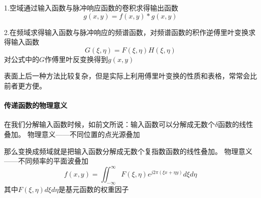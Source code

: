 \documentclass[UTF8]{ctexart}
\newcommand{\dbinf}{\iint_{-\infty}^{\infty}}
\begin{document}
1.空域通过输入函数与脉冲响应函数的卷积求得输出函数
\[
g(x,y)=f(x,y)*g(x,y)    
    \]
        
2.在频域求得输入函数与脉冲响应的频谱函数，对频谱函数的积作逆傅里叶变换求得输入函数
\[
G(\xi,\eta)=F(\xi,\eta)H(\xi,\eta)    
\]    
对公式中的$G$作傅里叶反变换得到$g(x,y)$

表面上后一种方法比较复杂，但是实际上利用傅里叶变换的性质和表格，常常会比前者更方便。

\paragraph{传递函数的物理意义}
在我们分解输入函数时候，如前文所说：输入函数可以分解成无数个$\delta$函数的线性叠加。
物理意义——不同位置的点光源叠加

那么变换成频域就是把输入函数分解成无数个复指数函数的线性叠加。
物理意义——不同频率的平面波叠加
\[
    f(x,y)=\dbinf F(\xi,\eta)e^{j2\pi(\xi x+\eta y)}d\xi d\eta
    \]
其中$F(\xi,\eta)d\xi d\eta$是基元函数的权重因子
\end{document}
